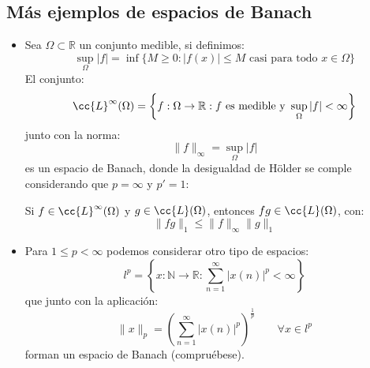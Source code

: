 \subsection{Más ejemplos de espacios de Banach}
\begin{itemize}
    \item Sea $\Omega\subset \mathbb{R}$ un conjunto medible, si definimos:
        \begin{equation*}
            \sup_\Omega |f| = \inf\{M\geq 0 : |f(x)| \leq M \text{\ casi para todo\ } x\in \Omega\}
        \end{equation*}
        El conjunto:
        \begin{equation*}
            \cc{L}^\infty(\Omega) = \left\{f:\Omega\to \mathbb{R} : f \text{\ es medible y\ } \sup_\Omega |f| < \infty\right\}
        \end{equation*}
        junto con la norma:
        \begin{equation*}
            \|f\|_\infty = \sup_\Omega |f|
        \end{equation*}
        es un espacio de Banach, donde la desigualdad de Hölder se comple considerando que $p=\infty$ y $p'=1$:

        Si $f\in \cc{L}^\infty(\Omega)$ y $g\in \cc{L}(\Omega)$, entonces $fg\in \cc{L}(\Omega)$, con:
        \begin{equation*}
            \|fg\|_1 \leq \|f\|_\infty \|g\|_1
        \end{equation*}
    \item Para $1\leq p < \infty$ podemos considerar otro tipo de espacios:
        \begin{equation*}
            l^p = \left\{x:\mathbb{N}\to \mathbb{R} : \sum_{n=1}^{\infty}|x(n)|^p < \infty\right\}
        \end{equation*}
        que junto con la aplicación:
        \begin{equation*}
            \|x\|_p = {\left(\sum_{n=1}^{\infty}|x(n)|^p\right)}^{\frac{1}{p}} \qquad \forall x\in l^p
        \end{equation*}
        forman un espacio de Banach (compruébese).


\end{itemize}
